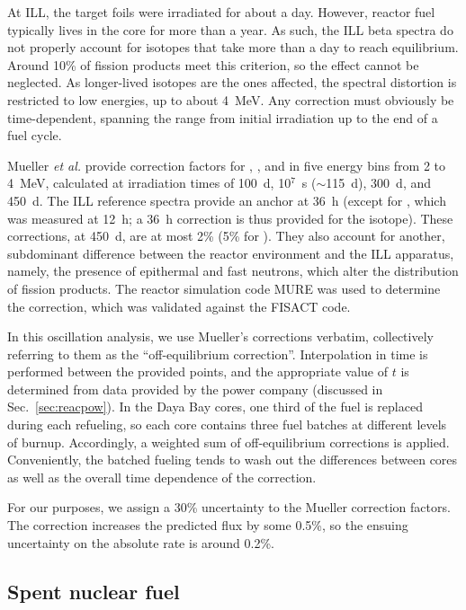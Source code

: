 \documentclass[../thesis.tex]{subfiles}
\begin{document}
At ILL, the target foils were irradiated for about a day. However, reactor fuel typically lives in the core for more than a year. As such, the ILL beta spectra do not properly account for isotopes that take more than a day to reach equilibrium. Around 10\% of fission products meet this criterion, so the effect cannot be neglected. As longer-lived isotopes are the ones affected, the spectral distortion is restricted to low energies, up to about 4~MeV. Any correction must obviously be time-dependent, spanning the range from initial irradiation up to the end of a fuel cycle.

Mueller \emph{et al.} provide correction factors for \urfive, \punine, and \puone in five energy bins from 2 to 4~MeV, calculated at irradiation times of 100~d, 10$^7$~s ($\sim$115~d), 300~d, and 450~d. The ILL reference spectra provide an anchor at 36~h (except for \urfive, which was measured at 12~h; a 36~h correction is thus provided for the isotope). These corrections, at 450~d, are at most 2\% (5\% for \urfive). They also account for another, subdominant difference between the reactor environment and the ILL apparatus, namely, the presence of epithermal and fast neutrons, which alter the distribution of fission products. The reactor simulation code MURE was used to determine the correction, which was validated against the FISACT code.

In this oscillation analysis, we use Mueller's corrections verbatim, collectively referring to them as the ``off-equilibrium correction''. Interpolation in time is performed between the provided points, and the appropriate value of $t$ is determined from data provided by the power company (discussed in Sec.~\ref{sec:reacpow}). In the Daya Bay cores, one third of the fuel is replaced during each refueling, so each core contains three fuel batches at different levels of burnup. Accordingly, a weighted sum of off-equilibrium corrections is applied. Conveniently, the batched fueling tends to wash out the differences between cores as well as the overall time dependence of the correction.

For our purposes, we assign a 30\% uncertainty to the Mueller correction factors. The correction increases the predicted flux by some 0.5\%, so the ensuing uncertainty on the absolute rate is around 0.2\%.

\subsection{Spent nuclear fuel}
\label{sec:snfcorr}
\end{document}
